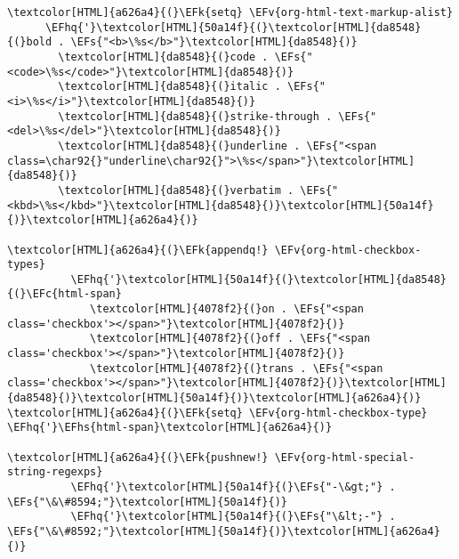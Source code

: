 \documentclass{scrartcl}
\newcommand{\EFk}[1]{\textcolor{EFk}{#1}} %
\newcommand{\EFs}[1]{\textcolor{EFs}{#1}} %
\newcommand{\EFc}[1]{\textcolor{EFc}{#1}} %
\newcommand{\EFv}[1]{\textcolor{EFv}{#1}} %
\newcommand{\EFhq}[1]{\textcolor{EFhq}{#1}} %
\newcommand{\EFhs}[1]{\textcolor{EFhs}{#1}} %
\begin{document}
\begin{Code}
\begin{Verbatim}[]
\textcolor[HTML]{a626a4}{(}\EFk{setq} \EFv{org-html-text-markup-alist}
      \EFhq{'}\textcolor[HTML]{50a14f}{(}\textcolor[HTML]{da8548}{(}bold . \EFs{"<b>\%s</b>"}\textcolor[HTML]{da8548}{)}
        \textcolor[HTML]{da8548}{(}code . \EFs{"<code>\%s</code>"}\textcolor[HTML]{da8548}{)}
        \textcolor[HTML]{da8548}{(}italic . \EFs{"<i>\%s</i>"}\textcolor[HTML]{da8548}{)}
        \textcolor[HTML]{da8548}{(}strike-through . \EFs{"<del>\%s</del>"}\textcolor[HTML]{da8548}{)}
        \textcolor[HTML]{da8548}{(}underline . \EFs{"<span class=\char92{}"underline\char92{}">\%s</span>"}\textcolor[HTML]{da8548}{)}
        \textcolor[HTML]{da8548}{(}verbatim . \EFs{"<kbd>\%s</kbd>"}\textcolor[HTML]{da8548}{)}\textcolor[HTML]{50a14f}{)}\textcolor[HTML]{a626a4}{)}

\textcolor[HTML]{a626a4}{(}\EFk{appendq!} \EFv{org-html-checkbox-types}
          \EFhq{'}\textcolor[HTML]{50a14f}{(}\textcolor[HTML]{da8548}{(}\EFc{html-span}
             \textcolor[HTML]{4078f2}{(}on . \EFs{"<span class='checkbox'></span>"}\textcolor[HTML]{4078f2}{)}
             \textcolor[HTML]{4078f2}{(}off . \EFs{"<span class='checkbox'></span>"}\textcolor[HTML]{4078f2}{)}
             \textcolor[HTML]{4078f2}{(}trans . \EFs{"<span class='checkbox'></span>"}\textcolor[HTML]{4078f2}{)}\textcolor[HTML]{da8548}{)}\textcolor[HTML]{50a14f}{)}\textcolor[HTML]{a626a4}{)}
\textcolor[HTML]{a626a4}{(}\EFk{setq} \EFv{org-html-checkbox-type} \EFhq{'}\EFhs{html-span}\textcolor[HTML]{a626a4}{)}

\textcolor[HTML]{a626a4}{(}\EFk{pushnew!} \EFv{org-html-special-string-regexps}
          \EFhq{'}\textcolor[HTML]{50a14f}{(}\EFs{"-\&gt;"} . \EFs{"\&\#8594;"}\textcolor[HTML]{50a14f}{)}
          \EFhq{'}\textcolor[HTML]{50a14f}{(}\EFs{"\&lt;-"} . \EFs{"\&\#8592;"}\textcolor[HTML]{50a14f}{)}\textcolor[HTML]{a626a4}{)}


\end{Verbatim}
\end{Code}
\end{document}

